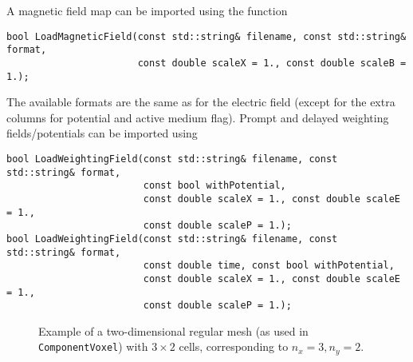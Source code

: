 A magnetic field map can be imported using the function
\begin{lstlisting}
bool LoadMagneticField(const std::string& filename, const std::string& format,
                       const double scaleX = 1., const double scaleB = 1.);
\end{lstlisting}
The available formats are the same as for the electric field (except for the 
extra columns for potential and active medium flag).
Prompt and delayed weighting fields/potentials can be imported using
\begin{lstlisting}
bool LoadWeightingField(const std::string& filename, const std::string& format,
                        const bool withPotential,
                        const double scaleX = 1., const double scaleE = 1.,
                        const double scaleP = 1.);
bool LoadWeightingField(const std::string& filename, const std::string& format,
                        const double time, const bool withPotential,
                        const double scaleX = 1., const double scaleE = 1.,
                        const double scaleP = 1.);
\end{lstlisting}

\begin{figure}
  \centering
  \caption{Example of a two-dimensional regular mesh (as used in 
           \texttt{ComponentVoxel}) with $3\times2$ cells, 
           corresponding to $n_{x} = 3, n_{y} = 2$.} 
  \label{Fig:MeshComponentVoxel}
\end{figure}


